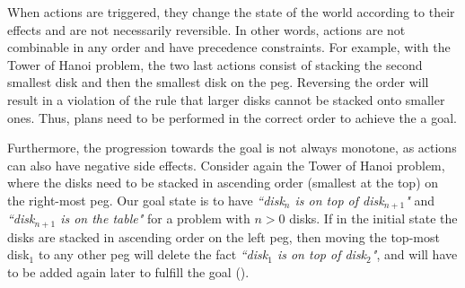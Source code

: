 When actions are triggered, they change the state of the world according to their effects and are not necessarily reversible. 
In other words, actions are not combinable in any order and have precedence constraints. 
For example, with the Tower of Hanoi problem, the two last actions consist of stacking the second smallest disk and then the smallest disk on the peg. 
Reversing the order will result in a violation of the rule that larger disks cannot be stacked onto smaller ones. Thus, plans need to be performed in the correct order to achieve the a goal.

Furthermore, the progression towards the goal is not always monotone, as actions can also have negative side effects. 
Consider again the Tower of Hanoi problem, where the disks need to be stacked in ascending order (smallest at the top) on the right-most peg. 
Our goal state is to have \textit{``disk$_{n}$ is on top of disk$_{n+1}$"} and \textit{``disk$_{n+1}$ is on the table"} for a problem with $n>0$ disks. 
If in the initial state the disks are stacked in ascending order on the left peg, then moving the top-most disk$_1$ to any other peg will delete the fact \textit{``disk$_1$ is on top of disk$_2$"}, and will have to be added again later to fulfill the goal ().




